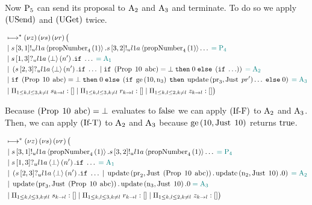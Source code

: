 Now $\Proposer{5}$ can send its proposal to $\Acceptor{2}$ and $\Acceptor{3}$ and terminate.
To do so we apply $\RUsend$ and $\RUget$ twice.

\begin{align*}
&\mapstostar\NuChannels\big (\\
&\Or
\SendUnreliableP{\ChannelS}{3}{1}{\LOneA}{\proposalNumber{1}{4}}.
\SendUnreliableP{\ChannelS}{3}{2}{\LOneA}{\proposalNumber{1}{4}}\ldots
\comment{= \Proposer{4}}\\
&\Or \ReceiveUnreliableP{\ChannelS}{1}{3}{\LOneA}{\bot}{n'}.\If \ldots \comment{= \Acceptor{1}}\\
&\Or
    \Paren{
        \ReceiveUnreliableP{\ChannelS}{2}{3}{\LOneA}{\bot}{n'}.\If \ldots
        \Or
        \If \Paren{\ProposalC{10}{\ABC}} = \bot
        \;\Then \End
        \;\Else \Paren{\If \ldots}
    } \comment{= \Acceptor{2}}\\
&\Or
    \If \Paren{\ProposalC{10}{\ABC}} = \bot
    \;\Then \End
    \;\Else \Paren{
        \If \greaterEqual{10}{\NumberRegister_3}
        \;\Then \update{\ProposalRegister_3}{\Just{pr'}}\ldots
        \;\Else \End
    }
    \comment{= \Acceptor{3}}\\
&\Or \InnerSessionQueues{\ChannelS}
\Or \InnerSessionQueues{\ChannelR}
\Or \OuterSessionQueues
\big )
\end{align*}

Because $\Paren{\ProposalC{10}{\ABC}} = \bot$ evaluates to $\False$ we can apply $\RIfF$ to $\Acceptor{2}$ and $\Acceptor{3}$.
Then, we can apply $\RIfT$ to $\Acceptor{2}$ and $\Acceptor{3}$ because $\greaterEqual{10}{\Just{10}}$ returns $\True$.

\begin{align*}
&\mapstostar\NuChannels\big (\\
&\Or
\SendUnreliableP{\ChannelS}{3}{1}{\LOneA}{\proposalNumber{1}{4}}.
\SendUnreliableP{\ChannelS}{3}{2}{\LOneA}{\proposalNumber{1}{4}}\ldots
\comment{= \Proposer{4}}\\
&\Or \ReceiveUnreliableP{\ChannelS}{1}{3}{\LOneA}{\bot}{n'}.\If \ldots \comment{= \Acceptor{1}}\\
&\Or
    \Paren{
        \ReceiveUnreliableP{\ChannelS}{2}{3}{\LOneA}{\bot}{n'}.\If \ldots
        \Or
            \update{\ProposalRegister_2}{\Just{\Paren{\ProposalC{10}{\ABC}}}}.
            \update{\NumberRegister_2}{\Just{10}}.
            \End
    } \comment{= \Acceptor{2}}\\
&\Or
    \update{\ProposalRegister_3}{\Just{\Paren{\ProposalC{10}{\ABC}}}}.
    \update{\NumberRegister_3}{\Just{10}}.
    \End
    \comment{= \Acceptor{3}}\\
&\Or \InnerSessionQueues{\ChannelS}
\Or \InnerSessionQueues{\ChannelR}
\Or \OuterSessionQueues
\big )
\end{align*}

